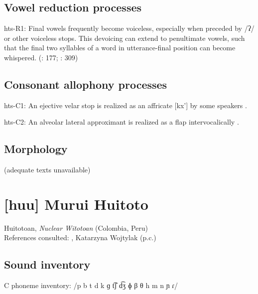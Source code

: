{\subsection*{Vowel reduction processes}
\begin{appendixdesc}

\item[hts-R1:] Final vowels frequently become voiceless, especially when preceded by /ʔ/ or other voiceless stops. This devoicing can extend to penultimate vowels, such that the final two syllables of a word in utterance-final position can become whispered. (\citealt{SandsEtAl1996}: 177; \citealt{TuckerWoodburn1977}: 309)
\end{appendixdesc}
\subsection*{Consonant allophony processes}
\begin{appendixdesc}

\item[hts-C1:] An ejective velar stop is realized as an affricate [kx’] by some speakers \citep[41]{Sands2013}.

\item[hts-C2:] An alveolar lateral approximant is realized as a flap intervocalically \citep[41]{Sands2013}.
\end{appendixdesc}
\subsection*{Morphology}

(adequate texts unavailable)

\section*{[huu] Murui Huitoto}   %
Huitotoan, \textit{Nuclear Witotoan} (Colombia, Peru)\medskip\\
References consulted: \citet{Wojtylak2017}, Katarzyna Wojtylak (p.c.)

\subsection*{Sound inventory}
\begin{appendixdesc}

\item[C phoneme inventory:] /p b t d k ɡ t͡ʃ d͡ʒ ɸ β θ h m n ɲ ɾ/


\end{appendixdesc}}
